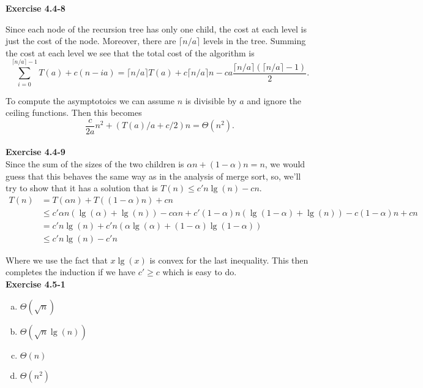 \documentclass{article}
\begin{document}
\noindent\textbf{Exercise 4.4-8}\\


Since each node of the recursion tree has only one child, the cost at each level is just the cost of the node.  Moreover, there are $\lceil n/a \rceil$ levels in the tree.  Summing the cost at each level we see that the total cost of the algorithm is 
\[ \sum_{i=0}^{\lceil n/a \rceil - 1} T(a) + c(n-ia) = \lceil n/a \rceil T(a) + c\lceil n/a \rceil n - ca \frac{\lceil n/a \rceil(\lceil n/a \rceil - 1)}{2}.\]

To compute the asymptotoics we can assume $n$ is divisible by $a$ and ignore the ceiling functions.  Then this becomes
\[ \frac{c}{2a}n^2 + (T(a)/a + c/2)n = \Theta(n^2).\]\\

\noindent\textbf{Exercise 4.4-9}\\

Since the sum of the sizes of the two children is $\alpha n + (1-\alpha) n = n$, we would guess that this behaves the same way as in the analysis of merge sort, so, we'll try to show that it has a solution that is $T(n) \le c' n\lg(n)-cn$. 
\begin{align*}
T(n)&= T(\alpha n)+ T((1-\alpha)n) + cn\\
&\le c'\alpha n (\lg(\alpha)+\lg(n)) - c\alpha n + c'(1-\alpha) n (\lg(1-\alpha) + \lg(n)) - c(1-\alpha) n + cn\\
&= c'n\lg(n) + c'n( \alpha\lg(\alpha) + (1-\alpha)\lg(1-\alpha))\\
& \le  c'n\lg(n) - c'n
\end{align*}

Where we use the fact that $x\lg(x)$ is convex for the last inequality. This then completes the induction if we have $c' \ge c$ which is easy to do.\\

\noindent\textbf{Exercise 4.5-1}\\

\begin{enumerate}[a.]
\item
$\Theta(\sqrt{n})$
\item
$\Theta(\sqrt{n}\lg(n))$
\item
$\Theta(n)$
\item
$\Theta(n^2)$
\end{enumerate}
\end{document}
